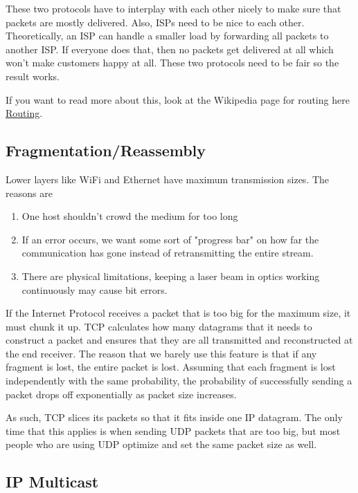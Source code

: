 These two protocols have to interplay with each other nicely to make sure that packets are mostly delivered.
Also, ISPs need to be nice to each other.
Theoretically, an ISP can handle a smaller load by forwarding all packets to another ISP.
If everyone does that, then no packets get delivered at all which won't make customers happy at all.
These two protocols need to be fair so the result works.

If you want to read more about this, look at the Wikipedia page for routing here \href{https://en.wikipedia.org/wiki/Routing}{Routing}.

\subsection{Fragmentation/Reassembly}

Lower layers like WiFi and Ethernet have maximum transmission sizes.
The reasons are

\begin{enumerate}
  \item One host shouldn't crowd the medium for too long
  \item If an error occurs, we want some sort of "progress bar" on how far the communication has gone instead of retransmitting the entire stream.
  \item There are physical limitations, keeping a laser beam in optics working continuously may cause bit errors.
\end{enumerate}

If the Internet Protocol receives a packet that is too big for the maximum size, it must chunk it up.
TCP calculates how many datagrams that it needs to construct a packet and ensures that they are all transmitted and reconstructed at the end receiver.
The reason that we barely use this feature is that if any fragment is lost, the entire packet is lost.
Assuming that each fragment is lost independently with the same probability, the probability of successfully sending a packet drops off exponentially as packet size increases.

As such, TCP slices its packets so that it fits inside one IP datagram.
The only time that this applies is when sending UDP packets that are too big, but most people who are using UDP optimize and set the same packet size as well.

\subsection{IP Multicast}

